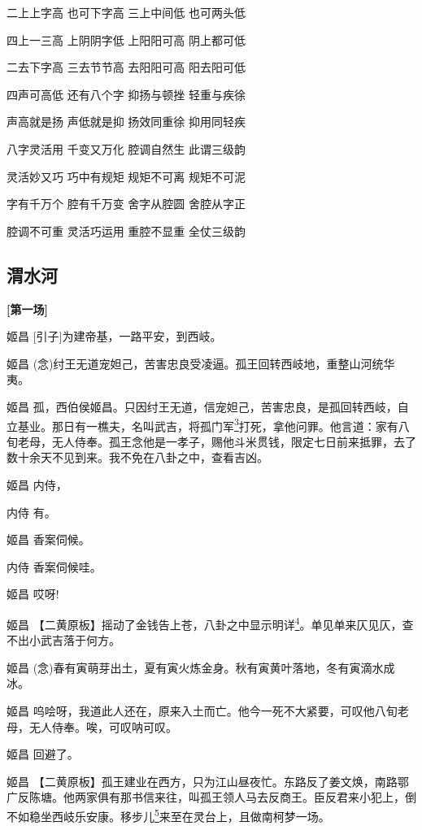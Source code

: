 二上上字高 也可下字高 三上中间低 也可两头低

四上一三高 上阴阴字低 上阳阳可高 阴上都可低

二去下字高 三去节节高 去阳阳可高 阳去阳可低

四声可高低 还有八个字 抑扬与顿挫 轻重与疾徐

声高就是扬 声低就是抑 扬效同重徐 抑用同轻疾

八字灵活用 千变又万化 腔调自然生 此谓三级韵

灵活妙又巧 巧中有规矩 规矩不可离 规矩不可泥

字有千万个 腔有千万变 舍字从腔圆 舍腔从字正

腔调不可重 灵活巧运用 重腔不显重 全仗三级韵

\hypertarget{ux6e2dux6c34ux6cb3}{%
\subsection{渭水河}\label{ux6e2dux6c34ux6cb3}}

\textbf{{[}第一场{]}}

姬昌 {[}引子{]}为建帝基，一路平安，到西岐。

姬昌
(念)纣王无道宠妲己，苦害忠良受凌逼。孤王回转西岐地，重整山河统华夷。

姬昌
孤，西伯侯姬昌。只因纣王无道，信宠妲己，苦害忠良，是孤回转西岐，自立基业。那日有一樵夫，名叫武吉，将孤门军\protect\hyperlink{fn3}{\textsuperscript{3}}打死，拿他问罪。他言道：家有八旬老母，无人侍奉。孤王念他是一孝子，赐他斗米贯钱，限定七日前来抵罪，去了数十余天不见到来。我不免在八卦之中，查看吉凶。

姬昌 内侍，

内侍 有。

姬昌 香案伺候。

内侍 香案伺候哇。

姬昌 哎呀!

姬昌
【二黄原板】摇动了金钱告上苍，八卦之中显示明详\protect\hyperlink{fn4}{\textsuperscript{4}}。单见单来仄见仄，查不出小武吉落于何方。

姬昌
(念)春有寅萌芽出土，夏有寅火炼金身。秋有寅黄叶落地，冬有寅滴水成冰。

姬昌
呜哙呀，我道此人还在，原来入土而亡。他今一死不大紧要，可叹他八旬老母，无人侍奉。唉，可叹呐可叹。

姬昌 回避了。

姬昌
【二黄原板】孤王建业在西方，只为江山昼夜忙。东路反了姜文焕，南路鄂广反陈塘。他两家俱有那书信来往，叫孤王领人马去反商王。臣反君来小犯上，倒不如稳坐西岐乐安康。移步儿\protect\hyperlink{fn5}{\textsuperscript{5}}来至在灵台上，且做南柯梦一场。

